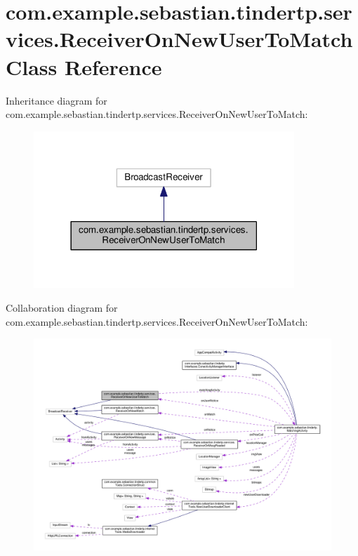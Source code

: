 \hypertarget{classcom_1_1example_1_1sebastian_1_1tindertp_1_1services_1_1ReceiverOnNewUserToMatch}{}\section{com.\+example.\+sebastian.\+tindertp.\+services.\+Receiver\+On\+New\+User\+To\+Match Class Reference}
\label{classcom_1_1example_1_1sebastian_1_1tindertp_1_1services_1_1ReceiverOnNewUserToMatch}


Inheritance diagram for com.\+example.\+sebastian.\+tindertp.\+services.\+Receiver\+On\+New\+User\+To\+Match\+:\nopagebreak
\begin{figure}[H]
\begin{center}
\leavevmode
\includegraphics[width=278pt]{classcom_1_1example_1_1sebastian_1_1tindertp_1_1services_1_1ReceiverOnNewUserToMatch__inherit__graph}
\end{center}
\end{figure}


Collaboration diagram for com.\+example.\+sebastian.\+tindertp.\+services.\+Receiver\+On\+New\+User\+To\+Match\+:\nopagebreak
\begin{figure}[H]
\begin{center}
\leavevmode
\includegraphics[width=350pt]{classcom_1_1example_1_1sebastian_1_1tindertp_1_1services_1_1ReceiverOnNewUserToMatch__coll__graph}
\end{center}
\end{figure}
